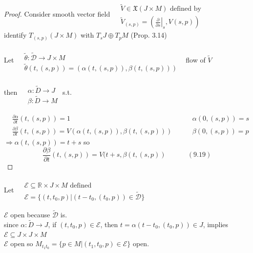 \documentclass[11pt]{amsart}
\theoremstyle{definition}
\begin{document}
\begin{proof}
Consider smooth vector field $\begin{aligned}
& \quad  \\
  & \widetilde{V} \in \mathfrak{X}(J \times M ) \text{ defined by } \\
  & \widetilde{V}_{(s,p)} = \left( \left. \frac{ \partial }{ \partial s } \right|_s, V(s,p) \right) \end{aligned}$ \\

identify $T_{(s,p)}(J \times M)$ with $T_sJ \oplus T_pM$ (Prop. 3.14)

Let $\begin{aligned}
& \quad \\
  & \widetilde{\theta} : \widetilde{\mathcal{D}} \to J \times M \\
  & \widetilde{\theta}(t,(s,p)) = (\alpha(t,(s,p)) , \beta(t,(s,p)) ) \end{aligned}$ \quad \, flow of $\widetilde{V}$

then $\begin{aligned}
 & \quad \\
  & \alpha: \widetilde{D} \to J \\
  & \beta: \widetilde{D} \to M \end{aligned}$ s.t.

\[
\begin{aligned}
  & \frac{ \partial \alpha}{ \partial t}(t,(s,p) ) = 1 \quad \quad \, & \alpha(0,(s,p)) = s \\
  & \frac{ \partial \beta}{ \partial t}(t,(s,p)) = V(\alpha(t,(s,p)), \beta(t,(s,p))) \quad \quad \, & \beta(0,(s,p)) = p
\end{aligned}
\]
$\Longrightarrow \alpha(t,(s,p)) = t+s$ so
\begin{equation}
  \frac{ \partial \beta}{ \partial t}(t,(s,p)) = V(t+s,\beta(t,(s,p)) \quad \quad \quad \, (9.19)
\end{equation}
\end{proof}


Let $\begin{aligned}
  & \quad \\
  & \mathcal{E} \subseteq \mathbb{R} \times J \times M \text{ defined } \\
  & \mathcal{E} = \lbrace (t,t_0, p) | (t-t_0, (t_0,p) ) \in \widetilde{\mathcal{D}} \rbrace \end{aligned}$

$\mathcal{E}$ open because $\widetilde{\mathcal{D}}$ is. \\
since $\alpha: \widetilde{D} \to J$, if $(t,t_0, p) \in \mathcal{E}$, then $t= \alpha(t-t_0,(t_0,p)) \in J$, implies $\mathcal{E} \subseteq J \times J \times M$ \\
$\mathcal{E}$ open so $M_{t_1t_0} = \lbrace p \in M | (t_1,t_0, p) \in \mathcal{E} \rbrace$ open.
\end{document}
